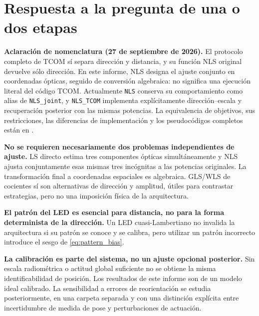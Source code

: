 \documentclass[11pt,a4paper]{article}
\begin{document}
\section{Respuesta a la pregunta de una o dos etapas}
\textbf{Aclaración de nomenclatura (27 de septiembre de 2026).} El protocolo completo de TCOM sí separa dirección y distancia, y su función NLS original devuelve sólo dirección. En este informe, NLS designa el ajuste conjunto en coordenadas ópticas, seguido de conversión algebraica: no significa una ejecución literal del código TCOM. Actualmente \texttt{NLS} conserva su comportamiento como alias de \texttt{NLS\_joint}, y \texttt{NLS\_TCOM} implementa explícitamente dirección--escala y recuperación posterior con las mismas potencias. La equivalencia de objetivos, sus restricciones, las diferencias de implementación y los pseudocódigos completos están en .

\textbf{No se requieren necesariamente dos problemas independientes de ajuste.} LS directo estima tres componentes ópticas simultáneamente y NLS ajusta conjuntamente esas mismas tres incógnitas a las potencias originales. La transformación final a coordenadas espaciales es algebraica. GLS/WLS de cocientes sí son alternativas de dirección y amplitud, útiles para contrastar estrategias, pero no una imposición física de la arquitectura.

\textbf{El patrón del LED es esencial para distancia, no para la forma determinista de la dirección.} Un LED cuasi-Lambertiano no invalida la arquitectura si su patrón se conoce y se calibra, pero utilizar un patrón incorrecto introduce el sesgo de \eqref{eq:pattern_bias}.

\textbf{La calibración es parte del sistema, no un ajuste opcional posterior.} Sin escala radiométrica o actitud global suficiente no se obtiene la misma identificabilidad de posición. Los resultados de este informe son de un modelo ideal calibrado. La sensibilidad a errores de reorientación se estudia posteriormente, en una carpeta separada y con una distinción explícita entre incertidumbre de medida de pose y perturbaciones de actuación.



\end{document}
